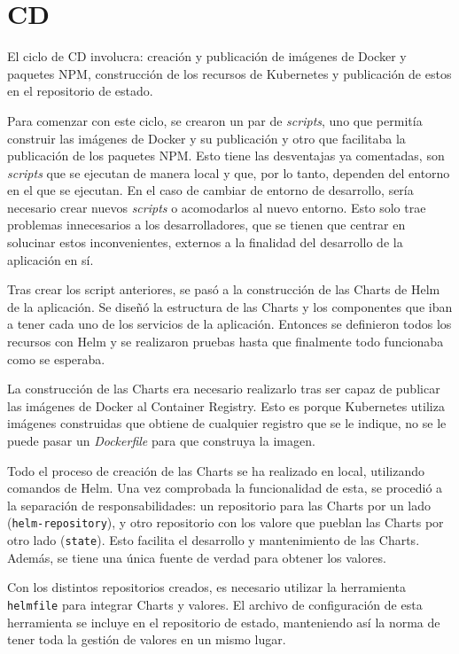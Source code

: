 \section{CD}

El ciclo de CD involucra: creación y publicación de imágenes de Docker y paquetes NPM, construcción de los recursos de Kubernetes y publicación de estos en el repositorio de estado.

Para comenzar con este ciclo, se crearon un par de \textit{scripts}, uno que permitía construir las imágenes de Docker y su publicación y otro que facilitaba la publicación de los paquetes NPM. Esto tiene las desventajas ya comentadas, son \textit{scripts} que se ejecutan de manera local y que, por lo tanto, dependen del entorno en el que se ejecutan. En el caso de cambiar de entorno de desarrollo, sería necesario crear nuevos \textit{scripts} o acomodarlos al nuevo entorno. Esto solo trae problemas innecesarios a los desarrolladores, que se tienen que centrar en solucinar estos inconvenientes, externos a la finalidad del desarrollo de la aplicación en sí.

Tras crear los script anteriores, se pasó a la construcción de las Charts de Helm de la aplicación. Se diseñó la estructura de las Charts y los componentes que iban a tener cada uno de los servicios de la aplicación. Entonces se definieron todos los recursos con Helm y se realizaron pruebas hasta que finalmente todo funcionaba como se esperaba.

La construcción de las Charts era necesario realizarlo tras ser capaz de publicar las imágenes de Docker al Container Registry. Esto es porque Kubernetes utiliza imágenes construidas que obtiene de cualquier registro que se le indique, no se le puede pasar un \textit{Dockerfile} para que construya la imagen.

Todo el proceso de creación de las Charts se ha realizado en local, utilizando comandos de Helm. Una vez comprobada la funcionalidad de esta, se procedió a la separación de responsabilidades: un repositorio para las Charts por un lado (\texttt{helm-repository}), y otro repositorio con los valore que pueblan las Charts por otro lado (\texttt{state}). Esto facilita el desarrollo y mantenimiento de las Charts. Además, se tiene una única fuente de verdad para obtener los valores.

Con los distintos repositorios creados, es necesario utilizar la herramienta \texttt{helmfile} para integrar Charts y valores. El archivo de configuración de esta herramienta se incluye en el repositorio de estado, manteniendo así la norma de tener toda la gestión de valores en un mismo lugar.

